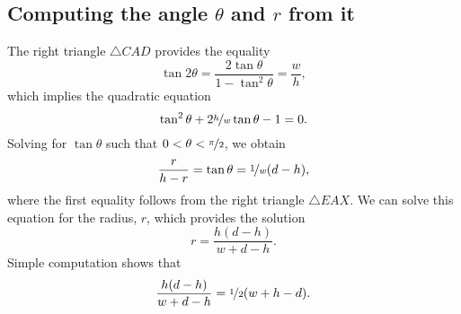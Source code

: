 \appendix

\newcommand*{\bbU}{\mathbb{U}}

\subsection{Computing the angle $\theta$ and $r$ from it}

The right triangle $\triangle CAD$ provides the equality \[ \tan{2\theta} =
\frac{2\tan{\theta}}{1-\tan^2{\theta}} = \frac{w}{h}, \] which implies the
quadratic equation \[ \tan^2{\theta} + 2\nicefrac{h}{w}\tan{\theta} - 1 = 0. \]
Solving for $\tan{\theta}$ such that $0 < \theta < \nicefrac{\pi}{2}$, we obtain
\[ \frac{r}{h-r} = \tan{\theta} = \nicefrac{1}{w}(d-h), \] where the first 
equality follows from the right triangle $\triangle EAX$. We can solve this
equation for the radius, $r$, which provides the solution
%
\begin{equation}
  r = \frac{h(d-h)}{w+d-h}.
  \label{eq:radiusalt}
\end{equation}
%
Simple computation shows that 
\[ \frac{h(d-h)}{w+d-h} = \nicefrac{1}{2}(w+h-d). \]
